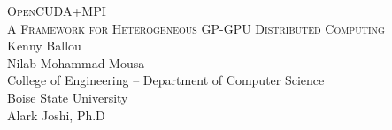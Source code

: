 \begin{titlepage}
\begin{center}

\textsc{\LARGE OpenCUDA+MPI}\\[1.5cm]
\textsc{\Large A Framework for Heterogeneous
               GP-GPU Distributed Computing}\\[1.5cm]

Kenny Ballou\\
Nilab Mohammad Mousa\\
College of Engineering -- Department of Computer Science\\
Boise State University\\
Alark Joshi, Ph.D\\
\vfill
\end{center}
\end{titlepage}
